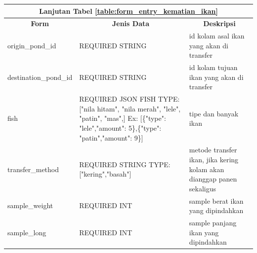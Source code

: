\begin{enumerate}[1.]
\begin{longtable}{| l | p{5cm} | p{5cm} |}
\hline
\multicolumn{3}{|c|}{Lanjutan Tabel \ref{table:form_entry_kematian_ikan}}\\
\hline
\multicolumn{1}{|c|}{\textbf{Form}} & \multicolumn{1}{|c|}{\textbf{Jenis Data}} & \multicolumn{1}{|c|}{\textbf{Deskripsi}}\\
\hline
\endhead

                                          

origin\_pond\_id         & REQUIRED STRING                                                                                                                                             & id kolam asal ikan yang akan di transfer                                                                                                                                                      \\ \hline
destination\_pond\_id    & REQUIRED STRING                                                                                                                                             & id kolam tujuan ikan yang akan di transfer                                                                                                                                                    \\ \hline
fish                     & REQUIRED JSON FISH TYPE: {[}"nila hitam", "nila merah", "lele", "patin", "mas",{]} Ex: {[}\{"type": "lele","amount": 5\},\{"type": "patin","amount": 9\}{]} & tipe dan banyak ikan                                                                                                                                                                          \\ \hline
transfer\_method         & REQUIRED STRING TYPE: {[}"kering","basah"{]}                                                                                                                & metode transfer ikan, jika kering kolam akan dianggap panen sekaligus                                                                                                                         \\ \hline
sample\_weight           & REQUIRED INT                                                                                                                                                & sample berat ikan yang dipindahkan                                                                                                                                                            \\ \hline
sample\_long             & REQUIRED INT                                                                                                                                                & sample panjang ikan yang dipindahkan                                                                                                                                                          \\ \hline

\end{longtable}
\end{enumerate}
